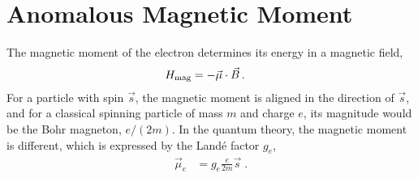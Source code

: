 \documentclass[12pt]{report}
\newcommand{\2}{\ensuremath{\sqrt{2}\,}}
\begin{document}
{    \section{Anomalous Magnetic Moment}
      The magnetic moment of the electron determines its energy in a magnetic field,
      \begin{align}
        H_\text{mag}&=-\vec{\mu}\cdot\vec{B} \,.\index{Magnetic moment}
      \end{align}
      For a particle with spin $\vec{s}$, the magnetic moment is aligned in the direction of
      $\vec{s}$, and for a classical spinning particle of mass $m$ and charge $e$, its magnitude
      would be the Bohr magneton, $e/(2m)$. In the quantum theory, the magnetic moment is different,
      which is expressed by the Land\'e factor $g_e$,
      \begin{align}
        \vec{\mu}_e &= g_e\frac{e}{2m} \vec{s}\;.
      \end{align}
      
}
\end{document}
